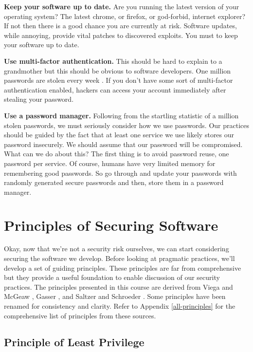 \textbf{Keep your software up to date.}
Are you running the latest version of your operating system?
The latest chrome, or firefox, or god-forbid, internet explorer?
If not then there is a good chance you are currently at risk.
Software updates, while annoying, provide vital patches to discovered exploits.
You must to keep your software up to date.

\textbf{Use multi-factor authentication.}
This should be hard to explain to a grandmother but this should be obvious to software developers.
One million passwords are stolen every week \cite{password-security}.
If you don't have some sort of multi-factor authentication enabled, hackers can access your account immediately after stealing your password.

\textbf{Use a password manager.}
Following from the startling statistic of a million stolen passwords, we must seriously consider how we use passwords.
Our practices should be guided by the fact that at least one service we use likely stores our password insecurely.
We should assume that our password will be compromised.
What can we do about this?
The first thing is to avoid password reuse, one password per service.
Of course, humans have very limited memory for remembering good passwords.
So go through and update your passwords with randomly generated secure passwords and then, store them in a password manager.


\section{Principles of Securing Software}
Okay, now that we're not a security risk ourselves, we can start considering securing the software we develop.
Before looking at pragmatic practices, we'll develop a set of guiding principles.
These principles are far from comprehensive but they provide a useful foundation to enable discussion of our security practices.
The principles presented in this course are derived from Viega and McGeaw \cite{2001-security-design-principles},
Gasser \cite{1988-security-design-principles}, and Saltzer and Schroeder \cite{1975-security-design-principles}.
Some principles have been renamed for consistency and clarity.
Refer to Appendix \ref{all-principles} for the comprehensive list of principles from these sources. 

\subsection{Principle of Least Privilege}

